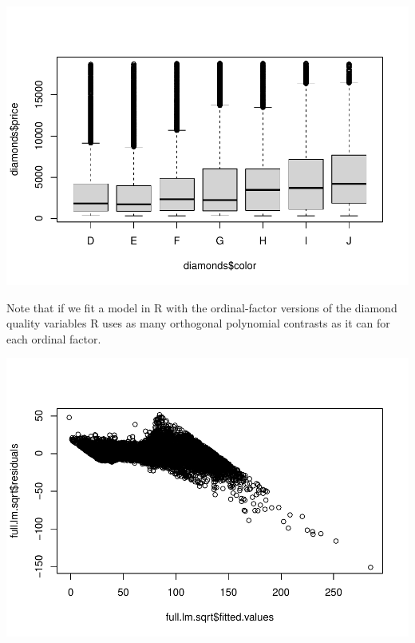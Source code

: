 \documentclass[
]{book}
\newenvironment{Shaded}{\begin{snugshade}}{\end{snugshade}}
\newcommand{\AttributeTok}[1]{\textcolor[rgb]{0.77,0.63,0.00}{#1}}
\newcommand{\FunctionTok}[1]{\textcolor[rgb]{0.00,0.00,0.00}{#1}}
\newcommand{\NormalTok}[1]{#1}
\newcommand{\OtherTok}[1]{\textcolor[rgb]{0.56,0.35,0.01}{#1}}
\newcommand{\SpecialCharTok}[1]{\textcolor[rgb]{0.00,0.00,0.00}{#1}}
\begin{document}
\includegraphics{13-MultipleLinearRegression_files/figure-latex/unnamed-chunk-3-6.pdf}

Note that if we fit a model in R with the ordinal-factor versions of the diamond quality variables R uses as many orthogonal polynomial contrasts as it can for each ordinal factor.

\begin{Shaded}
\end{Shaded}

\includegraphics{13-MultipleLinearRegression_files/figure-latex/unnamed-chunk-4-1.pdf}
\end{document}
